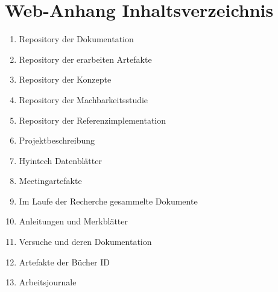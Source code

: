 \documentclass[
	a4paper
]{scrartcl}
\begin{document}
\section*{Web-Anhang Inhaltsverzeichnis}

\begin{enumerate}
	\item Repository der Dokumentation
	\item Repository der erarbeiten Artefakte
	\item Repository der Konzepte
	\item Repository der Machbarkeitsstudie
	\item Repository der Referenzimplementation
	\item Projektbeschreibung
	\item Hyintech Datenblätter
	\item Meetingartefakte
	\item Im Laufe der Recherche gesammelte Dokumente
	\item Anleitungen und Merkblätter
	\item Versuche und deren Dokumentation
	\item Artefakte der Bücher ID
	\item Arbeitsjournale
\end{enumerate}
\end{document}
